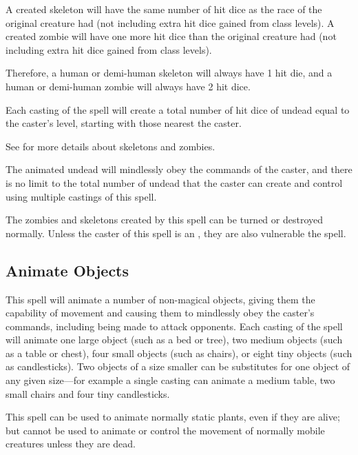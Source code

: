 \begin{multicols*}{2}
A created skeleton will have the same number of hit dice as the race of the original creature had (not including extra hit dice gained from class levels). A created zombie will have one more hit dice than the original creature had (not including extra hit dice gained from class levels).

Therefore, a human or demi-human skeleton will always have 1 hit die, and a human or demi-human zombie will always have 2 hit dice.

Each casting of the spell will create a total number of hit dice of undead equal to the caster’s level, starting with those nearest the caster.

See  for more details about skeletons and zombies.

The animated undead will mindlessly obey the commands of the caster, and there is no limit to the total number of undead that the caster can create and control using multiple castings of this spell.

The zombies and skeletons created by this spell can be turned or destroyed normally. Unless the caster of this spell is an , they are also vulnerable the  spell.

\subsection{Animate Objects}\label{spell:Animate Objects}

This spell will animate a number of non-magical objects, giving them the capability of movement and causing them to mindlessly obey the caster’s commands, including being made to attack opponents. Each casting of the spell will animate one large object (such as a bed or tree), two medium objects (such as a table or chest), four small objects (such as chairs), or eight tiny objects (such as candlesticks). Two objects of a size smaller can be substitutes for one object of any given size—for example a single casting can animate a medium table, two small chairs and four tiny candlesticks.

This spell can be used to animate normally static plants, even if they are alive; but cannot be used to animate or control the movement of normally mobile creatures unless they are dead.


\end{multicols*}
